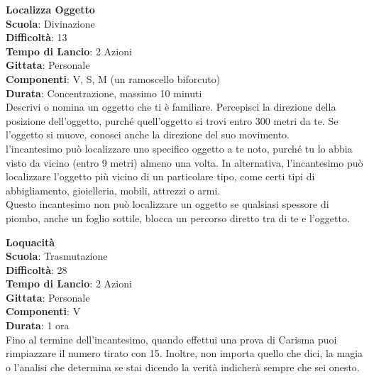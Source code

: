 \begin{multicols}{2}
\medskip\textbf{Localizza Oggetto}\\
\textbf{Scuola}: Divinazione\\
\textbf{Difficoltà}:  13\\
\textbf{Tempo di Lancio}: 2 Azioni\\
\textbf{Gittata}: Personale\\
\textbf{Componenti}: V, S, M (un ramoscello biforcuto)\\
\textbf{Durata}: Concentrazione, massimo 10 minuti \\
Descrivi o nomina un oggetto che ti è familiare. Percepisci la direzione della posizione dell'oggetto, purché quell'oggetto si trovi entro 300 metri da te. Se l’oggetto si muove, conosci anche la direzione del suo movimento.\\
l'incantesimo può localizzare uno specifico oggetto a te noto, purché tu lo abbia visto da vicino (entro 9 metri) almeno una volta. In alternativa, l'incantesimo può localizzare l’oggetto più vicino di un particolare tipo, come certi tipi di abbigliamento, gioielleria, mobili, attrezzi o armi.\\
Questo incantesimo non può localizzare un oggetto se qualsiasi spessore di piombo, anche un foglio sottile, blocca un percorso diretto tra di te e l’oggetto. 

\medskip\textbf{Loquacità}\\
\textbf{Scuola}: Trasmutazione\\
\textbf{Difficoltà}:  28\\
\textbf{Tempo di Lancio}: 2 Azioni\\
\textbf{Gittata}: Personale\\
\textbf{Componenti}: V\\
\textbf{Durata}: 1 ora\\
Fino al termine dell'incantesimo, quando effettui una prova di Carisma puoi rimpiazzare il numero tirato con 15. Inoltre, non importa quello che dici, la magia o l'analisi che determina se stai dicendo la verità indicherà sempre che sei onesto.


\end{multicols}
